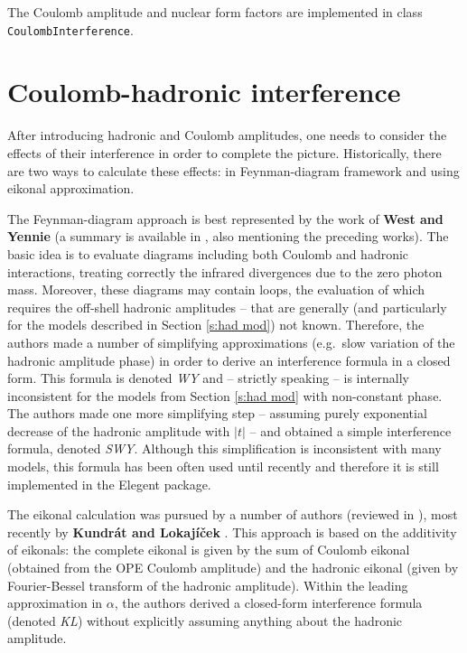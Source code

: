 \documentclass[preprint,12pt]{elsarticle}
\begin{document}
The Coulomb amplitude and nuclear form factors are implemented in class {\tt CoulombInterference}.



\section{Coulomb-hadronic interference}\label{s:int mod}

After introducing hadronic and Coulomb amplitudes, one needs to consider the effects of their interference in order to complete the picture. Historically, there are two ways to calculate these effects: in Feynman-diagram framework and using eikonal approximation.

The Feynman-diagram approach is best represented by the work of {\bf West and Yennie} \cite{wy68} (a summary is available in \cite[section 1.3.4]{jan_thesis}, also mentioning the preceding works). The basic idea is to evaluate diagrams including both Coulomb and hadronic interactions, treating correctly the infrared divergences due to the zero photon mass. Moreover, these diagrams may contain loops, the evaluation of which requires the off-shell hadronic amplitudes -- that are generally (and particularly for the models described in Section \ref{s:had mod}) not known. Therefore, the authors made a number of simplifying approximations (e.g.~slow variation of the hadronic amplitude phase) in order to derive an interference formula in a closed form. This formula is denoted {\em WY} and -- strictly speaking -- is internally inconsistent for the models from Section \ref{s:had mod} with non-constant phase. The authors made one more simplifying step -- assuming purely exponential decrease of the hadronic amplitude with $|t|$ -- and obtained a simple interference formula, denoted {\em SWY}. Although this simplification is inconsistent with many models, this formula has been often used until recently and therefore it is still implemented in the Elegent package.

The eikonal calculation was pursued by a number of authors (reviewed in \cite[section 1.3.5]{jan_thesis}), most recently by {\bf Kundr\' at and Lokaj\' i\v cek} \cite{kl94}. This approach is based on the additivity of eikonals: the complete eikonal is given by the sum of Coulomb eikonal (obtained from the OPE Coulomb amplitude) and the hadronic eikonal (given by Fourier-Bessel transform of the hadronic amplitude). Within the leading approximation in $\alpha$, the authors derived a closed-form interference formula (denoted {\em KL}) without explicitly assuming anything about the hadronic amplitude.
\end{document}

